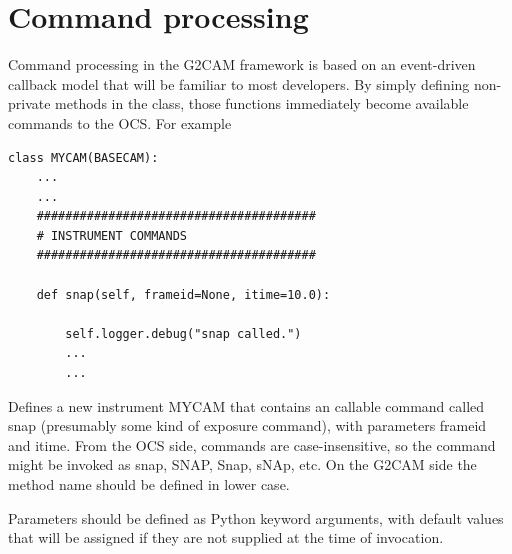 \documentclass[11pt]{report}
\begin{document}
\section{Command processing}
Command processing in the G2CAM framework is based on an event-driven
callback model that will be familiar to most developers. By simply
defining non-private methods in the class, those functions immediately
become available commands to the OCS. For example 
\begin{verbatim}
class MYCAM(BASECAM):
    ...
    ...
    #######################################
    # INSTRUMENT COMMANDS
    #######################################

    def snap(self, frameid=None, itime=10.0):

        self.logger.debug("snap called.")
        ...
        ...

\end{verbatim}
Defines a new instrument MYCAM that contains an callable command called
snap (presumably some kind of exposure command), with parameters frameid
and itime. From the OCS side, commands are case-insensitive, so the
command might be invoked as snap, SNAP, Snap, sNAp, etc. 
On the G2CAM side the method name should be defined in lower case. 

Parameters should be defined as Python keyword arguments, with default
values that will be assigned if they are not supplied at the time of
invocation. 
\end{document}
